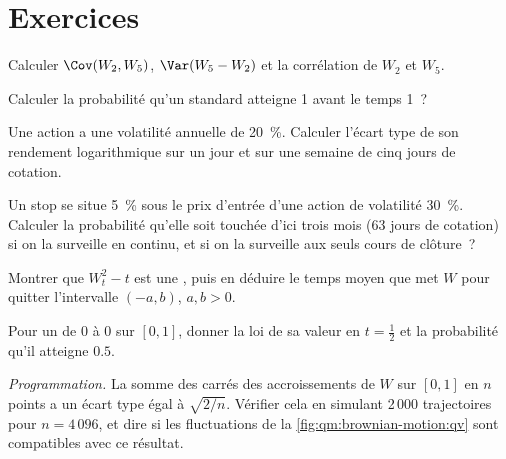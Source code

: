 \section{Exercices}

\begin{exercise}[$\star$]\label{exo:qm:brownian-motion:1}
Calculer $\Cov(W_2, W_5)$, $\Var(W_5 - W_2)$ et la corrélation de $W_2$ et $W_5$.
\end{exercise}

\begin{exercise}[$\star$]\label{exo:qm:brownian-motion:2}
Calculer la probabilité qu'un  standard atteigne 1 avant le temps 1~?
\end{exercise}

\begin{exercise}[$\star$]\label{exo:qm:brownian-motion:3}
Une action a une volatilité annuelle de 20~\%. Calculer l'écart type de son rendement logarithmique
sur un jour et sur une semaine de cinq jours de cotation.
\end{exercise}

\begin{exercise}[$\star\star$]\label{exo:qm:brownian-motion:4}
Un stop se situe 5~\% sous le prix d'entrée d'une action de volatilité 30~\%. Calculer la probabilité qu'elle soit
touchée d'ici trois mois (63 jours de cotation) si on la surveille en continu, et si on la surveille
aux seuls cours de clôture~?
\end{exercise}

\begin{exercise}[$\star\star$]\label{exo:qm:brownian-motion:5}
Montrer que $W_t^2 - t$ est une , puis en déduire le temps moyen que met $W$ pour quitter
l'intervalle $(-a, b)$, $a, b > 0$.
\end{exercise}

\begin{exercise}[$\star\star$]\label{exo:qm:brownian-motion:6}
Pour un  de 0 à 0 sur $[0, 1]$, donner la loi de sa valeur en $t = \tfrac12$ et la
probabilité qu'il atteigne $0.5$.
\end{exercise}

\begin{exercise}[$\star\star\star$]\label{exo:qm:brownian-motion:7}
\emph{Programmation.} La somme des carrés des accroissements de $W$ sur $[0,1]$ en $n$ points a un écart type
égal à $\sqrt{2/n}$. Vérifier cela en simulant 2\,000 trajectoires pour $n = 4\,096$, et dire si les
fluctuations de la \cref{fig:qm:brownian-motion:qv} sont compatibles avec ce résultat.
\end{exercise}

